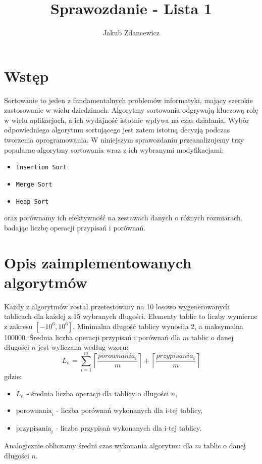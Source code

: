 \documentclass{article}
\title{Sprawozdanie - Lista 1}
\author{Jakub Zdancewicz}
\date{}
\begin{document}
\maketitle

\tableofcontents
\newpage

\section{Wstęp}
Sortowanie to jeden z fundamentalnych problemów informatyki, mający szerokie zastosowanie w wielu dziedzinach. Algorytmy sortowania odgrywają kluczową rolę w wielu aplikacjach, a ich wydajność istotnie wpływa na czas działania. Wybór odpowiedniego algorytmu sortującego jest zatem istotną decyzją podczas tworzenia oprogramowania. W niniejszym sprawozdaniu przeanalizujemy trzy popularne algorytmy sortowania wraz z ich wybranymi modyfikacjami:
\begin{itemize}
    \item \texttt{Insertion Sort}
    \item \texttt{Merge Sort}
    \item \texttt{Heap Sort}
\end{itemize}
oraz porównamy ich efektywność na zestawach danych o różnych rozmiarach, badając liczbę operacji przypisań i porównań.


\section{Opis zaimplementowanych algorytmów}
Każdy z algorytmów został przetestowany na 10 losowo wygenerowanych tablicach dla każdej z 15 wybranych długości. Elementy tablic to liczby wymierne z zakresu $[-10^6, 10^6]$. Minimalna długość tablicy wynosiła 2, a maksymalna 100000. Średnia liczba operacji przypisań i porównań dla $m$ tablic o danej długości $n$ jest wyliczana według wzoru:
\[
    L_n = \sum_{i=1}^{m} \left\lceil\frac{porownania_i}{m}\right\rceil + \left\lceil\frac{przypisania_i}{m}\right\rceil
\]
gdzie:
\begin{itemize}
    \item[] $L_n$ - średnia liczba operacji dla tablicy o długości $n$,
    \item[] $\text{porownania}_i$ - liczba porównań wykonanych dla i-tej tablicy,
    \item[] $\text{przypisania}_i$ - liczba przypisań wykonanych dla i-tej tablicy.
\end{itemize}
Analogicznie obliczamy średni czas wykonania algorytmu dla $m$ tablic o danej długości $n$.
\newpage
\end{document}

